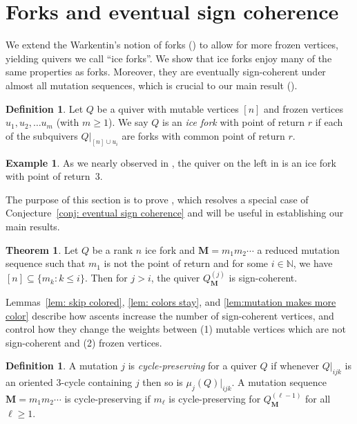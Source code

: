 \documentclass[12pt]{amsart}
\theoremstyle{definition}
\newtheorem{defn}[thm]{Definition}
\newtheorem{exmp}[thm]{Example}
\newtheorem{definition}[thm]{Definition}
\newtheorem{theorem}[thm]{Theorem} %
\theoremstyle{remark}
\numberwithin{equation}{section}
\newcommand{\N} { \mathbb{N}}
\begin{document}
\section{Forks and eventual sign coherence}
\label{sec:fork eventual coherence}

We extend the Warkentin's notion of forks () to allow for more frozen vertices, yielding quivers we call ``ice forks''.  We show that ice forks enjoy many of the same properties as forks.  Moreover, they are eventually sign-coherent under almost all mutation sequences, which is crucial to our main result ().


\begin{definition}
\label{def:ice fork}
Let $Q$ be a quiver with mutable vertices $[n]$ and frozen vertices $u_1, u_2, \ldots u_m$ (with $m\geq 1$). 
We say $Q$ is an \emph{ice fork} with point of return $r$ if 
each of the subquivers $Q|_{[n] \cup u_i}$ are forks with common point of return $r$. 
\end{definition}

\begin{exmp}
As we nearly observed in , the quiver on the left in  is an ice fork with point of return~$3$. 
\end{exmp}

The purpose of this section is to prove , which resolves a special case of Conjecture~\ref{conj: eventual sign coherence} and will be useful in establishing our main results.


\begin{theorem}
\label{thm:Asym Sign Coherence}
Let $Q$ be a rank $n$ ice fork and $\mathbf M = m_1 m_2 \cdots $ a reduced mutation sequence such that $m_1$ is not the point  of return and for some $i \in \N$, we have $[n] \subseteq \{m_k : k \leq i\}$.
Then for $j > i$, the quiver $Q^{(j)}_{\mathbf M}$ is sign-coherent. 
\end{theorem}

Lemmas~\ref{lem: skip colored}, \ref{lem: colors stay}, and \ref{lem:mutation makes more color} describe how ascents increase the number of sign-coherent vertices, and control how they change the weights between (1) mutable vertices which are not sign-coherent and (2) frozen vertices.


\begin{defn}
\label{def:cycle-preserving}
A mutation $j$ is \emph{cycle-preserving} for a quiver $Q$ if whenever $Q|_{ijk}$ is an oriented 3-cycle containing $j$ then so is $\mu_j(Q)|_{ijk}$. %
A mutation sequence $\mathbf M = m_1 m_2 \cdots $ is cycle-preserving if $m_{\ell}$ is cycle-preserving for $Q_{\mathbf M}^{(\ell-1)}$ for all $\ell \geq 1$. 
\end{defn}
\end{document}

